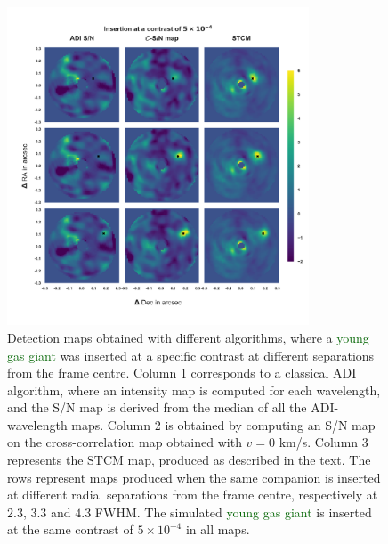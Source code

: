 \documentclass[referee]{aa} %
\newcommand{\newchange}[1]{\textcolor{darkgreen}{#1}}
\begin{document}
\begin{figure}%
    \centering
    \includegraphics[width=0.8\textwidth]{Fig1_Dec_highres_noinbetween.png}
    \caption{Detection maps obtained with different algorithms, where a \newchange{young gas giant} was inserted at a specific contrast at different separations from the frame centre. Column 1 corresponds to a classical ADI algorithm, where an intensity map is computed for each wavelength, and the S/N map is derived from the median of all the ADI-wavelength maps. Column 2 is obtained by computing an S/N map on the cross-correlation map obtained with $v=0$ km/s. Column 3 represents the STCM map, produced as described in the text. The rows represent maps produced when the same companion is inserted at different radial separations from the frame centre, respectively at $2.3$, $3.3$ and $4.3$ FWHM. %
    The simulated \newchange{young gas giant} is inserted at the same contrast of $5\times10^{-4}$ in all maps.}
    \label{fig:fig_1}
\end{figure}
\end{document}
